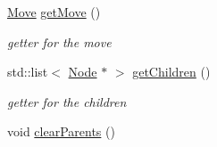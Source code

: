 \begin{DoxyCompactItemize}
\hyperlink{class_move}{Move} \hyperlink{classmcts_1_1_node_ad17cd9cf5c86f718aa99eb6597750d74}{get\+Move} ()
\begin{DoxyCompactList}\small\item\em getter for the move \end{DoxyCompactList}\item 
std\+::list$<$ \hyperlink{classmcts_1_1_node}{Node} $\ast$ $>$ \hyperlink{classmcts_1_1_node_a06fe80a95c5535f04c1f952b3e687d56}{get\+Children} ()
\begin{DoxyCompactList}\small\item\em getter for the children \end{DoxyCompactList}\item 
\hypertarget{classmcts_1_1_node_add60b79e66e67ae93a299d211f06f9c6}{void \hyperlink{classmcts_1_1_node_add60b79e66e67ae93a299d211f06f9c6}{clear\+Parents} ()}\label{classmcts_1_1_node_add60b79e66e67ae93a299d211f06f9c6}


\end{DoxyCompactItemize}

